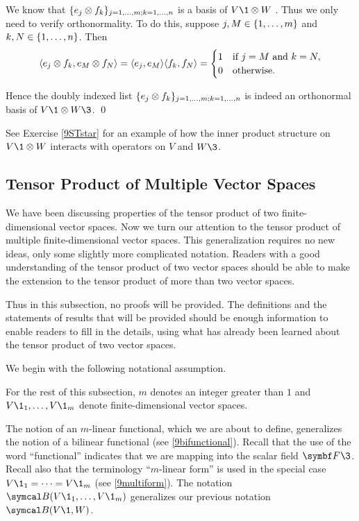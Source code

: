 \proof
We know that $\{e_j \otimes f_k\}_{j = 1, \ldots, m; k = 1, \ldots, n}$ is a basis of $V\1 \tensor W$ . Thus we only need to verify orthonormality. To do this, suppose $j, M \in \{1, \ldots, m\}$ and $k, N \in \{1, \ldots, n\}$. Then
\vspace{-.1in}
\[
\langle e_j \otimes f_k, e_M \otimes f_N \rangle = \langle e_j, e_M\rangle \langle f_k, f_N\rangle
= \begin{cases}
1 & \text{if } j = M \text{ and } k = N, \\
0 & \text{otherwise}.
\end{cases}
\]

\vspace{-.05in}
\noindent
Hence the doubly indexed list $\{e_j \otimes f_k\}_{j = 1, \ldots, m; k = 1, \ldots, n}$ is indeed an orthonormal basis of
$V\1 \tensor W\3$.
\qed

See Exercise \ref{9STstar} for an example of how the inner product structure on $V\1 \tensor W$ interacts with operators on $V$ and $W\3$.

\subsection{Tensor Product of Multiple Vector Spaces}

We have been discussing properties of the tensor product of two finite-dimensional vector spaces. Now we turn our attention to the tensor product of multiple finite-dimensional vector spaces. This generalization requires no new ideas, only some slightly more complicated notation. Readers with a good understanding of the tensor product of two vector spaces should be able to make the extension to the tensor product of more than two vector spaces.

Thus in this subsection, no proofs will be provided. The definitions and the statements of results that will be provided should be enough information to enable readers to fill in the details, using what has already been learned about the tensor product of two vector spaces.

We begin with the following notational assumption.

{For the rest of this subsection, $m$ denotes an integer greater than $1$ and $V\1_1, \ldots, V\1_m$ denote finite-dimensional vector spaces.}

The notion of an $m$-linear functional, which we are about to define, generalizes the notion of a bilinear functional (see \ref{9bifunctional}).
Recall that the use of the word ``functional'' indicates that we are mapping into the scalar field $\F{}\3$. Recall also that the terminology ``$m$-linear form'' is used in the special case $V\1_1 = \cdots = V\1_m$ (see \ref{9multiform}). The notation $\B(V\1_1, \ldots, V\1_m)$ generalizes our previous notation $\B(V\1, W)$.

